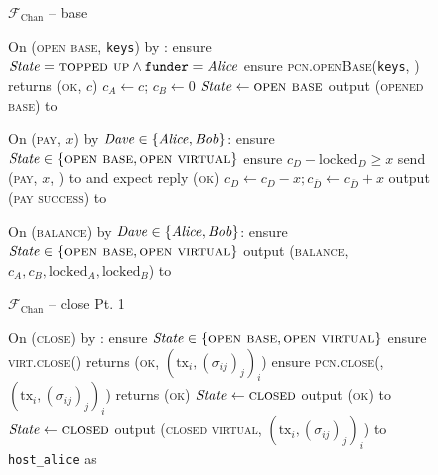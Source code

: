 \begin{figure}[H]
  \begin{systembox}{$\mathcal{F}_{\mathrm{Chan}}$ -- base}
    \begin{algorithmic}[1]
      \State On (\textsc{open base}, \texttt{keys}) by \alice:
      \Indent
        \State ensure $\mathit{State} = \textsc{topped up} \wedge
        \mathtt{funder} = \mathit{Alice}$
        \State ensure \textsc{pcn.openBase}(\texttt{keys}, \bob) returns
        (\textsc{ok}, $c$)
        \State $c_A \gets c$; $c_B \gets 0$
        \State $\mathit{State} \gets \textsc{open base}$
        \State output (\textsc{opened base}) to \alice
      \EndIndent
      \Statex

      \State On (\textsc{pay}, $x$) by $\mathit{Dave} \in \{\mathit{Alice}, \mathit{Bob}\}$:
      \Indent
        \State ensure $\mathit{State} \in \{\textsc{open base}, \textsc{open
        virtual}\}$
        \State ensure $c_D - \mathrm{locked}_D \geq x$
        \State send (\textsc{pay}, $x$, \dave) to \adversary and expect reply
        (\textsc{ok}) 
        \State $c_D \gets c_D - x; c_{\bar{D}} \gets c_{\bar{D}} + x$
        \State output (\textsc{pay success}) to \dave
      \EndIndent
      \Statex

      \State On (\textsc{balance}) by $\mathit{Dave} \in \{\mathit{Alice}, \mathit{Bob}\}$:
      \Indent
        \State ensure $\mathit{State} \in \{\textsc{open base}, \textsc{open
        virtual}\}$
        \State output (\textsc{balance}, $c_A, c_B, \mathrm{locked}_A,
        \mathrm{locked}_B$) to \dave
      \EndIndent
    \end{algorithmic}
  \end{systembox}
  \caption{}
  \label{code:functionality:chan:skeleton:base}
\end{figure}

\begin{figure}[H]
  \begin{systembox}{$\mathcal{F}_{\mathrm{Chan}}$ -- close Pt. 1}
    \begin{algorithmic}[1]
      \State On (\textsc{close}) by \alice:
      \Indent
        \State ensure $\mathit{State} \in \{\textsc{open base}, \textsc{open
        virtual}\}$
        \State ensure \textsc{virt.close}(\alice) returns (\textsc{ok},
        $(\mathrm{tx}_i, (\sigma_{ij})_j)_i$) 
          \State ensure \textsc{pcn.close}(\alice, $(\mathrm{tx}_i,
          (\sigma_{ij})_j)_i$) returns (\textsc{ok})
          \State $\mathit{State} \gets \textsc{closed}$
          \State output (\textsc{ok}) to \alice
        \Else \: 
          \State $\mathit{State} \gets \textsc{closed}$
          \State output (\textsc{closed virtual}, $(\mathrm{tx}_i,
          (\sigma_{ij})_j)_i$) to \texttt{host\_alice} as \alice
        \EndIf
      \EndIndent
    \end{algorithmic}
  \end{systembox}
  \caption{}
  \label{code:functionality:chan:skeleton:close:pt1}
\end{figure}

